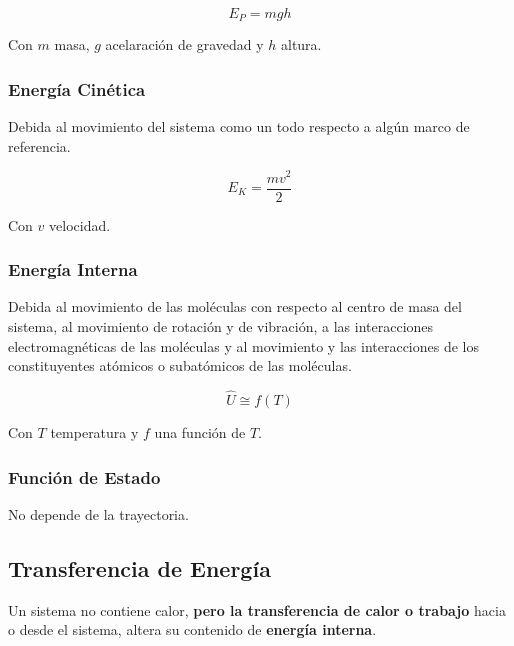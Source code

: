         \begin{equation}
        \label{eq:e_potencial}
            E_{P} = mgh
        \end{equation}
        
        Con \(m\) masa, \(g\) acelaración de gravedad y \(h\) altura.
        
        \subsubsection{Energía Cinética}
        
        Debida al movimiento del sistema como un todo respecto a algún marco de referencia.
        
        \begin{equation}
        \label{eq:e_cinetica}
            E_{K} = \frac{mv^{2}}{2}
        \end{equation}
        
        Con \(v\) velocidad.
        
        \subsubsection{Energía Interna}
        
        Debida al movimiento de las moléculas con respecto al centro de masa del sistema, al movimiento de rotación y de vibración, a las interacciones electromagnéticas de las moléculas y al movimiento y las interacciones de los constituyentes atómicos o subatómicos de las moléculas.
        
        \begin{equation}
        \label{eq:e_interna}
            \widehat{U} \cong f(T)
        \end{equation}
        
        Con \(T\) temperatura y \(f\) una función de \(T\).
        
        \subsubsection{Función de Estado}
        
        No depende de la trayectoria.
        
    \subsection{Transferencia de Energía}
    
    Un sistema no contiene calor, \textbf{pero la transferencia de calor o trabajo} hacia o desde el sistema, altera su contenido de \textbf{energía interna}.
    
